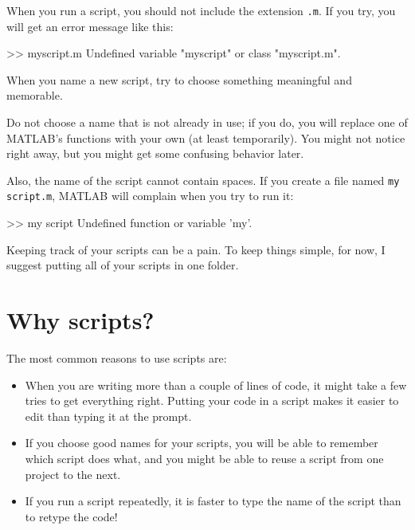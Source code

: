 \documentclass[main.tex]{subfiles}
\begin{document}
When you run a script, you should not include the extension {\tt .m}.  If you try, you will get an error message like this:

\begin{code}
>> myscript.m
Undefined variable "myscript" or class "myscript.m".
\end{code}

When you name a new script, try to choose something meaningful and memorable. 

Do not choose a name that is not already in use; if you do, you will replace one of MATLAB's functions with your own (at least temporarily).
You might not notice right away, but you might get some confusing behavior later.


Also, the name of the script cannot contain spaces.  If you create
a file named {\tt my script.m}, MATLAB will complain when you try
to run it:

\begin{code}
>> my script
Undefined function or variable 'my'.
\end{code}

Keeping track of your scripts can be a pain.  To keep things simple,
for now, I suggest putting all of your scripts in one folder.


\section{Why scripts?}

The most common reasons to use scripts are:


\begin{itemize}

\item When you are writing more than a couple of lines of code, it
might take a few tries to get everything right.  Putting your code
in a script makes it easier to edit than typing it at the prompt.

\item If you choose good names for your scripts, you will be able
to remember which script does what, and you might be able to reuse
a script from one project to the next.

\item If you run a script repeatedly, it is faster to type the
name of the script than to retype the code!

\end{itemize}
\end{document}
